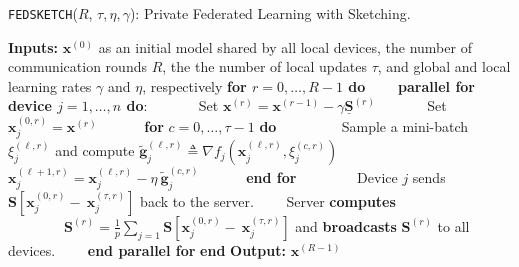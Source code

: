 \begin{algorithm}[H]
\caption{\texttt{FEDSKETCH}($R$, $\tau, \eta, \gamma$): Private Federated Learning with Sketching. }\label{Alg:PFLHom}
\begin{algorithmic}[1]
\State \textbf{Inputs:} $\boldsymbol{x}^{(0)}$ as an initial  model shared by all local devices, the number of communication rounds $R$, the the number of local updates $\tau$, and global and local learning rates $\gamma$ and $\eta$, respectively
\State \textbf{for $r=0, \ldots, R-1$ do}
\State $\qquad$\textbf{parallel for device $j=1,\ldots,n$ do}:
\State $\qquad\quad$ Set $\boldsymbol{x}^{(r)}=\boldsymbol{x}^{(r-1)}-\gamma\underline{\mathbf{S}}^{(r)}$
\State $\qquad\quad$ Set $\boldsymbol{x}_j^{(0,r)}=\boldsymbol{x}^{(r)}$ 
\State $\qquad\quad $\textbf{for} $c=0,\ldots,\tau-1$ \textbf{do}
\State $\qquad\quad\quad$ Sample a mini-batch $\xi_j^{(\ell,r)}$ and compute $\tilde{\mathbf{g}}_{j}^{(\ell,r)}\triangleq\nabla{f}_j(\boldsymbol{x}^{(\ell,r)}_j,\xi_j^{(c,r)})$
\State $\qquad\quad\quad$ $\boldsymbol{x}^{(\ell+1,r)}_{j}=\boldsymbol{x}^{(\ell,r)}_j-\eta~ \tilde{\mathbf{g}}_{j}^{(c,r)}$ \label{eq:update-rule-alg}
\State $\qquad\quad$\textbf{end for}
\State $\qquad\quad\quad$Device $j$ sends $\mathbf{S}\left[\boldsymbol{x}_j^{(0,r)}-~{\boldsymbol{x}}_{j}^{(\tau,r)}\right]$ back to the server.
\State $\qquad$Server \textbf{computes} 
\State $\qquad\qquad {\mathbf{S}}^{(r)}=\frac{1}{p}\sum_{j=1}\mathbf{S}\left[\boldsymbol{x}_j^{(0,r)}-~{\boldsymbol{x}}_{j}^{(\tau,r)}\right]$ and \textbf{broadcasts} ${\mathbf{S}}^{(r)}$ to all devices.
\State $\qquad$\textbf{end parallel for}
\State \textbf{end}
\State \textbf{Output:} ${\boldsymbol{x}}^{(R-1)}$
\vspace{- 0.1cm}
\end{algorithmic}
\end{algorithm}

